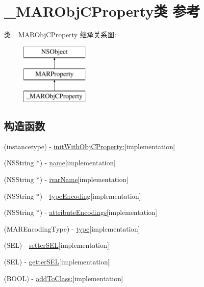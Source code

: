 \hypertarget{interface___m_a_r_obj_c_property}{}\section{\+\_\+\+M\+A\+R\+Obj\+C\+Property类 参考}
\label{interface___m_a_r_obj_c_property}
类 \+\_\+\+M\+A\+R\+Obj\+C\+Property 继承关系图\+:\begin{figure}[H]
\begin{center}
\leavevmode
\includegraphics[height=3.000000cm]{interface___m_a_r_obj_c_property}
\end{center}
\end{figure}
\subsection*{构造函数}
\begin{DoxyCompactItemize}
\item 
(instancetype) -\/ \hyperlink{interface___m_a_r_obj_c_property_a4854c8972a664dada2d8faee928cee8a}{init\+With\+Obj\+C\+Property\+:}{\ttfamily  \mbox{[}implementation\mbox{]}}
\item 
(N\+S\+String $\ast$) -\/ \hyperlink{interface___m_a_r_obj_c_property_aac68d2ed082bee7893ff90cd2a9e38d6}{name}{\ttfamily  \mbox{[}implementation\mbox{]}}
\item 
(N\+S\+String $\ast$) -\/ \hyperlink{interface___m_a_r_obj_c_property_a9a1df3b591493be4dbe9484c509faab0}{ivar\+Name}{\ttfamily  \mbox{[}implementation\mbox{]}}
\item 
(N\+S\+String $\ast$) -\/ \hyperlink{interface___m_a_r_obj_c_property_a7dfceeb0bb1ec7976f284a1ffcc6ec5f}{type\+Encoding}{\ttfamily  \mbox{[}implementation\mbox{]}}
\item 
(N\+S\+String $\ast$) -\/ \hyperlink{interface___m_a_r_obj_c_property_a0235ec3957b19ebf1830296486bbeaed}{attribute\+Encodings}{\ttfamily  \mbox{[}implementation\mbox{]}}
\item 
(M\+A\+R\+Encoding\+Type) -\/ \hyperlink{interface___m_a_r_obj_c_property_a6b611388f65922c109a1056d48fb384f}{type}{\ttfamily  \mbox{[}implementation\mbox{]}}
\item 
(S\+EL) -\/ \hyperlink{interface___m_a_r_obj_c_property_af150258daa039e9f73a821b16c12d4c0}{setter\+S\+EL}{\ttfamily  \mbox{[}implementation\mbox{]}}
\item 
(S\+EL) -\/ \hyperlink{interface___m_a_r_obj_c_property_a16c8828460bd52a4f560dee918700724}{getter\+S\+EL}{\ttfamily  \mbox{[}implementation\mbox{]}}
\item 
(B\+O\+OL) -\/ \hyperlink{interface___m_a_r_obj_c_property_a48f66f3c21b47da3c9edb39f4dcf0c01}{add\+To\+Class\+:}{\ttfamily  \mbox{[}implementation\mbox{]}}
\end{DoxyCompactItemize}
